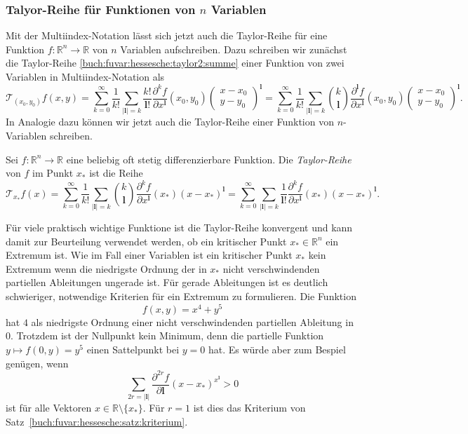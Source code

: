 \subsubsection{Talyor-Reihe für Funktionen von $n$ Variablen}
Mit der Multiindex-Notation lässt sich jetzt auch die Taylor-Reihe
für eine Funktion $f\colon\mathbb{R}^n\to\mathbb{R}$ von $n$ Variablen
aufschreiben.
Dazu schreiben wir zunächst die Taylor-Reihe
\eqref{buch:fuvar:hessesche:taylor2:summe}
einer Funktion von zwei Variablen in Multiindex-Notation als
\[
\mathscr{T}_{(x_0,y_0)}f(x,y)
=
\sum_{k=0}^\infty
\frac{1}{k!}
\sum_{|\mathbf{l}|=k}
\frac{k!}{\mathbf{l}!}
\frac{\partial^k f}{\partial x^{\mathbf{l}}}
(x_0,y_0)
\begin{pmatrix}
x-x_0\\
y-y_0
\end{pmatrix}^{\mathbf{l}}
=
\sum_{k=0}^\infty
\frac{1}{k!}
\sum_{|\mathbf{l}|=k}
\binom{k}{\mathbf{l}}
\frac{\partial^{\mathbf{l}} f}{\partial x^{\mathbf{l}}}(x_0,y_0)
\begin{pmatrix}
x-x_0\\
y-y_0
\end{pmatrix}^{\mathbf{l}}.
\]
In Analogie dazu können wir jetzt auch die Taylor-Reihe einer Funktion
von $n$-Variablen schreiben.

\begin{definition}
Sei $f\colon\mathbb{R}^n\to\mathbb{R}$ eine beliebig oft stetig
differenzierbare Funktion.
Die {\em Taylor-Reihe} von $f$ im Punkt $x_*$ ist die Reihe
\[
\mathscr{T}_{x_*} f(x)
=
\sum_{k=0}^\infty
\frac{1}{k!}
\sum_{|\mathbf{l}|=k}
\binom{k}{\mathbf{l}}
\frac{\partial^k f}{\partial x^{\mathbf{l}}}(x_*) (x-x_*)^{\mathbf{l}}
=
\sum_{k=0}^\infty
\sum_{|\mathbf{l}|=k}
\frac{1}{\mathbf{l}!}
\frac{\partial^k f}{\partial x^{\mathbf{l}}}(x_*) (x-x_*)^{\mathbf{l}}.
\]
\end{definition}

Für viele praktisch wichtige Funktione ist die Taylor-Reihe konvergent
und kann damit zur Beurteilung verwendet werden, ob ein kritischer Punkt
$x_*\in\mathbb{R}^n$ ein Extremum ist.
Wie im Fall einer Variablen ist ein kritischer Punkt $x_*$ kein Extremum
wenn die niedrigste Ordnung der in $x_*$ nicht verschwindenden partiellen
Ableitungen ungerade ist.
Für gerade Ableitungen ist es deutlich schwieriger, notwendige Kriterien
für ein Extremum zu formulieren.
Die Funktion
\[
f(x,y)
=
x^4 + y^5
\]
hat $4$ als niedrigste Ordnung einer nicht verschwindenden partiellen
Ableitung in $0$.
Trotzdem ist der Nullpunkt kein Minimum, denn die partielle Funktion
$y\mapsto f(0,y)=y^5$ einen Sattelpunkt bei $y=0$ hat.
Es würde aber zum Bespiel genügen, wenn
\[
\sum_{2r=|\mathbf{l}|}
\frac{\partial^{2r}f}{\partial \mathbf{l}}
(x-x_*)^{x^{\mathbf{l}}}
>
0
\]
ist für alle Vektoren $x\in\mathbb{R}\setminus\{x_*\}$.
Für $r=1$ ist dies das Kriterium von
Satz~\ref{buch:fuvar:hessesche:satz:kriterium}.



